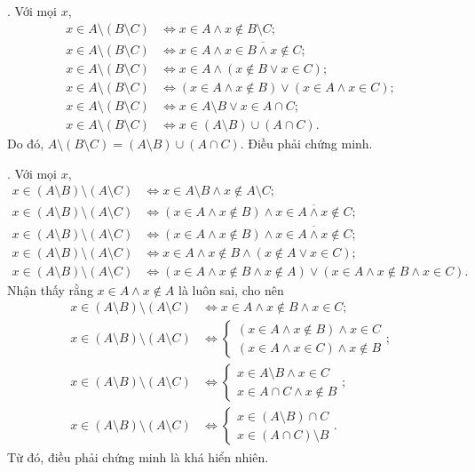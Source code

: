 . Với mọi $x$,
\begin{align*}
   x \in A \setminus (B \setminus C) &\iff x \in A \land x \notin B \setminus C; \\
   x \in A \setminus (B \setminus C) &\iff x \in A \land \overline{x \in B \land x \notin C}; \\
   x \in A \setminus (B \setminus C) &\iff x \in A \land \left(x \notin B \lor x \in C\right); \\
   x \in A \setminus (B \setminus C) &\iff (x \in A \land x \notin B) \lor (x \in A \land x \in C); \\
   x \in A \setminus (B \setminus C) &\iff x \in A \setminus B \lor x \in A \cap C; \\
   x \in A \setminus (B \setminus C) &\iff x \in (A \setminus B) \cup (A \cap C).
\end{align*}
Do đó, $A \setminus (B \setminus C) = (A \setminus B) \cup (A \cap C)$. Điều phải chứng minh.

. Với mọi $x$,
\begin{align*}
   x \in (A \setminus B) \setminus (A \setminus C) &\iff x \in A \setminus B \land x \notin A \setminus C; \\
   x \in (A \setminus B) \setminus (A \setminus C) &\iff (x \in A \land x \notin B) \land \overline{x \in A \land x \notin C}; \\
   x \in (A \setminus B) \setminus (A \setminus C) &\iff (x \in A \land x \notin B) \land \overline{x \in A \land x \notin C}; \\
   x \in (A \setminus B) \setminus (A \setminus C) &\iff x \in A \land x \notin B \land (x \notin A \lor x \in C); \\
   x \in (A \setminus B) \setminus (A \setminus C) &\iff (x \in A \land x \notin B \land x \notin A) \lor (x \in A \land x \notin B \land x \in C).
\end{align*}
Nhận thấy rằng $x \in A \land x \notin A$ là luôn sai, cho nên 
\begin{align*}
   x \in (A \setminus B) \setminus (A \setminus C) &\iff x \in A \land x \notin B \land x \in C; \\
   x \in (A \setminus B) \setminus (A \setminus C) &\iff \begin{cases}
      (x \in A \land x \notin B) \land x \in C \\
      (x \in A \land x \in C) \land x \notin B
   \end{cases}; \\
   x \in (A \setminus B) \setminus (A \setminus C) &\iff \begin{cases}
      x \in A \setminus B \land x \in C \\
      x \in A \cap C \land x \notin B
   \end{cases}; \\
   x \in (A \setminus B) \setminus (A \setminus C) &\iff \begin{cases}
      x \in (A \setminus B) \cap C \\
      x \in (A \cap C) \setminus B
   \end{cases}.
\end{align*}
Từ đó, điều phải chứng minh là khá hiển nhiên.

